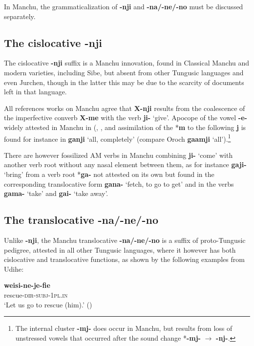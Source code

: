 \documentclass{article}
\newcommand{\ipa}[1]{\textbf{{\phon\mbox{#1}}}} %
\begin{document}
In Manchu, the grammaticalization of \ipa{-nji} and \ipa{-na/-ne/-no} must be discussed separately.

\subsection{The cislocative \ipa{-nji} }
The cislocative \ipa{-nji} suffix is a Manchu innovation, found in Classical Manchu and modern varieties, including Sibe, but absent from other Tungusic languages and even Jurchen, though in the latter this may be due to the scarcity of documents left in that language.

All references works on Manchu agree that \ipa{X-nji} results from the coalescence of the imperfective converb \ipa{X-me} with the verb \ipa{ji-} `give'. Apocope of the vowel \ipa{-e-} widely attested in Manchu in (\citealt[18-19]{hattori56manchu}, \citet[43-44]{gorelova02manchu}, and assimilation of the *\ipa{m} to the following \ipa{j} is found for instance in \ipa{ganji} `all, completely' (compare Oroch \ipa{gaamji} `all').\footnote{The internal cluster \ipa{-mj-} does occur in Manchu, but results from loss of unstressed vowels that occurred after the sound change *\ipa{-mj-} $\rightarrow$ \ipa{-nj-}. }


There are however fossilized AM verbs in Manchu combining \ipa{ji-} `come' with another verb root without any nasal element between them, as for instance \ipa{gaji-} `bring' from a verb root *\ipa{ga-} not attested on its own but found in the corresponding translocative form \ipa{gana-} `fetch, to go to get' and in the verbs \ipa{gama-} `take' and  \ipa{gai-} `take away'. 


\subsection{The translocative \ipa{-na/-ne/-no} }
Unlike \ipa{-nji}, the Manchu translocative \ipa{-na/-ne/-no} is a suffix of proto-Tungusic pedigree, attested in all other Tungusic languages, where it however has both cislocative and translocative functions, as shown by the following examples from Udihe:

\begin{exe}
\ex 
\gll \ipa{weisi-ne-je-fie} \\
rescue-\textsc{dir-subj-1pl.in} \\
\glt ‘Let us go to rescue (him).’ (\citealt[47]{nikolaeva01udihe})
\end{exe}
\end{document}
